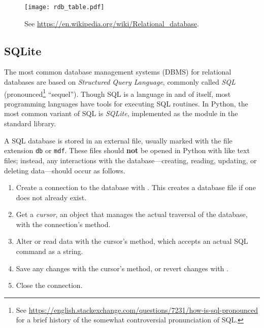 \begin{figure}[H]
    \centering
    \texttt{[image: rdb\_table.pdf]}
    \caption{See \url{https://en.wikipedia.org/wiki/Relational_database}.}
    \label{fig:sql-relation}
\end{figure}

\subsection*{SQLite} %

The most common database management systems (DBMS) for relational databases are based on \emph{Structured Query Language}, commonly called \emph{SQL} (pronounced\footnote{See \url{https://english.stackexchange.com/questions/7231/how-is-sql-pronounced} for a brief history of the somewhat controversial pronunciation of SQL.} ``sequel'').
Though SQL is a language in and of itself, most programming languages have tools for executing SQL routines.
In Python, the most common variant of SQL is \emph{SQLite}, implemented as the  module in the standard library.

A SQL database is stored in an external file, usually marked with the file extension \texttt{db} or \texttt{mdf}.
These files should \textbf{not} be opened in Python with  like text files; instead, any interactions with the database---creating, reading, updating, or deleting data---should occur as follows.

\begin{enumerate}
    \item Create a connection to the database with .
    This creates a database file if one does not already exist.
    \item Get a \emph{cursor}, an object that manages the actual traversal of the database, with the connection's  method.
    \item Alter or read data with the cursor's  method, which accepts an actual SQL command as a string.
    \item Save any changes with the cursor's  method, or revert changes with .
    \item Close the connection.
\end{enumerate}

